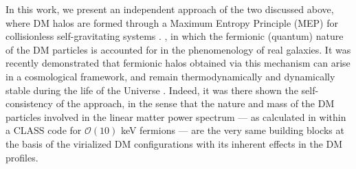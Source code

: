 In this work, we present an independent approach of the two discussed above, where DM halos are formed through a Maximum Entropy Principle (MEP) for collisionless self-gravitating systems \citep{1998MNRAS.300..981C,2015PhRvD..92l3527C,2020EPJP..135..290C,2021MNRAS.502.4227A}. , in which the fermionic (quantum) nature of the DM particles is accounted for in the phenomenology of real galaxies. It was recently demonstrated that fermionic halos obtained via this mechanism can arise in a cosmological framework, and remain thermodynamically and dynamically stable during the life of the Universe \citep{2021MNRAS.502.4227A}. Indeed, it was there shown the self-consistency of the approach, in the sense that the nature and mass of the DM particles involved in the linear matter power spectrum --- as calculated in \citet{2021MNRAS.502.4227A} within a CLASS code for $\mathcal{O}(10)$ keV fermions --- are the very same building blocks at the basis of the virialized DM configurations with its inherent effects in the DM profiles. 

